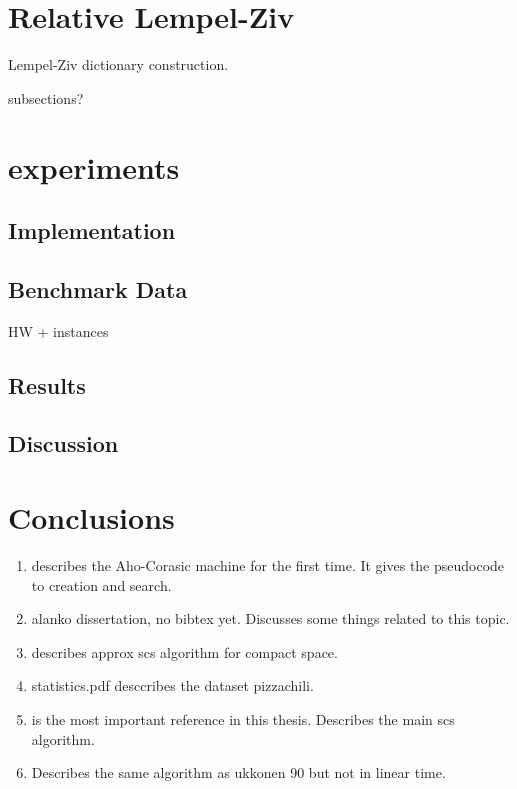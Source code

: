 \documentclass[english,twoside,censored,csm,algorithms-track-2020]{HYthesisML}
\theoremstyle{plain}
\theoremstyle{definition}
\begin{document}
\chapter{Relative Lempel-Ziv}

  Lempel-Ziv dictionary construction.

  subsections?

\chapter{experiments}

  \section{Implementation}

  \section{Benchmark Data}
  HW + instances

  \section{Results}

  \section{Discussion}

%
\chapter{Conclusions}
  

  \begin{enumerate}
  \item \citep{aho75} describes the Aho-Corasic machine for the first time. It gives the pseudocode to creation and search.
  \item alanko dissertation, no bibtex yet. Discusses some things related to this topic.
  \item \citep{alanko17} describes approx scs algorithm for compact space.
  \item statistics.pdf desccribes the dataset pizzachili.
  \item \citep{ukkonen90} is the most important reference in this thesis. Describes the main scs algorithm.
  \item \citep{tarhio88} Describes the same algorithm as ukkonen 90 but not in linear time.
  \end{enumerate}
\end{document}
